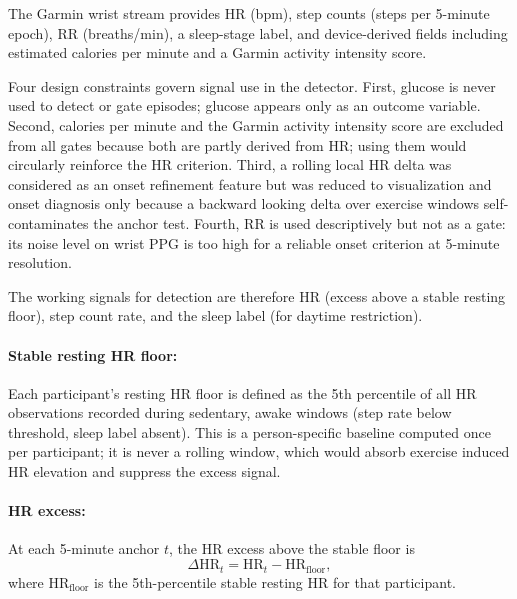 The Garmin wrist stream provides HR (bpm), step counts (steps per 5-minute
epoch), RR (breaths/min), a sleep-stage label, and device-derived fields
including estimated calories per minute and a Garmin activity intensity score.

Four design constraints govern signal use in the detector.
First, glucose is never used to detect or gate episodes; glucose
appears only as an outcome variable.
Second, calories per minute and the Garmin activity intensity score
are excluded from all gates because both are partly derived from HR; using them
would circularly reinforce the HR criterion.
Third, a rolling local HR delta was considered as an onset refinement
feature but was reduced to visualization and onset diagnosis only because a
backward looking delta over exercise windows self-contaminates the anchor test.
Fourth, RR is used descriptively but not as a gate: its noise level
on wrist PPG is too high for a reliable onset criterion at 5-minute resolution.

The working signals for detection are therefore HR (excess above a stable
resting floor), step count rate, and the sleep label (for daytime restriction).


\label{subsec:ex_gate}

\paragraph{Stable resting HR floor:}
Each participant's resting HR floor is defined as the 5th percentile of
all HR observations recorded during sedentary, awake windows
(step rate below threshold, sleep label absent).
This is a person-specific baseline  computed once per
participant; it is never a rolling window, which would absorb exercise induced
HR elevation and suppress the excess signal.

\paragraph{HR excess: }
At each 5-minute anchor $t$, the HR excess above the stable floor is
\begin{equation}
  \Delta\mathrm{HR}_{t} = \mathrm{HR}_{t} - \mathrm{HR}_{\text{floor}},
  \label{eq:hr_excess}
\end{equation}
where $\mathrm{HR}_{\text{floor}}$ is the 5th-percentile stable resting HR
for that participant.


